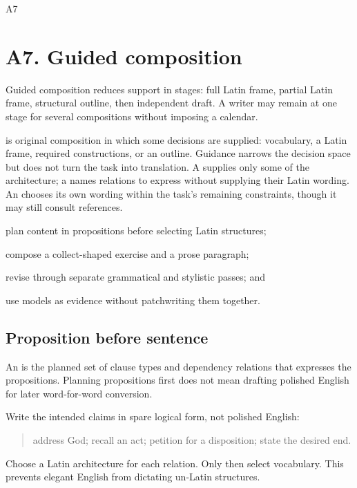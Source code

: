 \begin{courseunit}{A7}
\chapter{A7. Guided composition}

Guided composition reduces support in stages: full Latin frame, partial Latin
frame, structural outline, then independent draft. A writer may remain at one
stage for several compositions without imposing a calendar.

 is original composition in which some decisions are
supplied: vocabulary, a Latin frame, required constructions, or an outline.
Guidance narrows the decision space but does not turn the task into translation.
A  supplies only some of the architecture; a
 names relations to express without supplying their
Latin wording. An  chooses its own wording within the
task's remaining constraints, though it may still consult references.

\begin{learningobjectives}
  \item plan content in propositions before selecting Latin structures;
  \item compose a collect-shaped exercise and a prose paragraph;
  \item revise through separate grammatical and stylistic passes; and
  \item use models as evidence without patchwriting them together.
\end{learningobjectives}

\section{Proposition before sentence}

An  is the planned set of clause types and dependency
relations that expresses the propositions. Planning propositions first does
not mean drafting polished English for later word-for-word conversion.

Write the intended claims in spare logical form, not polished English:

\begin{quote}
address God; recall an act; petition for a disposition; state the desired end.
\end{quote}

Choose a Latin architecture for each relation. Only then select vocabulary.
This prevents elegant English from dictating un-Latin structures.


\end{courseunit}
